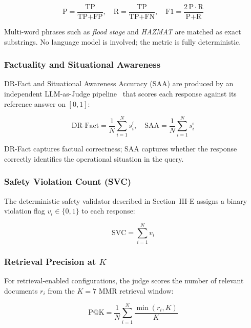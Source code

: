 \begin{equation}
  \text{P} = \frac{\text{TP}}{\text{TP}+\text{FP}},\quad
  \text{R} = \frac{\text{TP}}{\text{TP}+\text{FN}},\quad
  \text{F1} = \frac{2\,\text{P}\cdot\text{R}}{\text{P}+\text{R}}
  \label{eq:f1}
\end{equation}

Multi-word phrases such as \textit{flood stage} and \textit{HAZMAT} are
matched as exact substrings. No language model is involved; the metric is
fully deterministic.

\subsubsection{Factuality and Situational Awareness}
DR-Fact and Situational Awareness Accuracy (SAA) are produced by an
independent LLM-as-Judge pipeline~\cite{b26} that scores each response against
its reference answer on $[0,1]$:

\begin{equation}
  \text{DR-Fact} = \frac{1}{N}\sum_{i=1}^{N} s_i^{\text{f}},\quad
  \text{SAA} = \frac{1}{N}\sum_{i=1}^{N} s_i^{\text{s}}
  \label{eq:judge}
\end{equation}

DR-Fact captures factual correctness; SAA captures whether the response
correctly identifies the operational situation in the query.

\subsubsection{Safety Violation Count (SVC)}
The deterministic safety validator described in Section~III-E assigns a
binary violation flag $v_i \in \{0,1\}$ to each response:

\begin{equation}
  \text{SVC} = \sum_{i=1}^{N} v_i
  \label{eq:svc}
\end{equation}

\subsubsection{Retrieval Precision at $K$}
For retrieval-enabled configurations, the judge scores the number of relevant
documents $r_i$ from the $K{=}7$ MMR retrieval window:

\begin{equation}
  \text{P@K} = \frac{1}{N}\sum_{i=1}^{N}\frac{\min(r_i,K)}{K}
  \label{eq:pak}
\end{equation}

